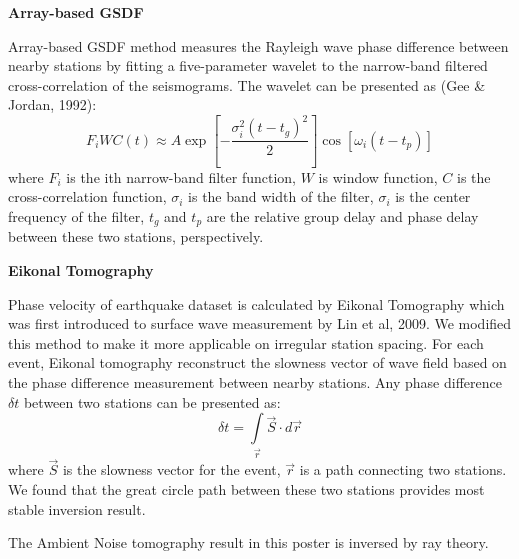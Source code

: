 \documentclass[paperwidth=65in,paperheight=43in,landscape,final,fontscale=0.30]{baposter}
\begin{document}
\begin{poster}
{\vspace{1em}

\noindent\textbf{\large Array-based GSDF}

Array-based GSDF method measures the Rayleigh wave phase difference between nearby stations by fitting a five-parameter wavelet to the narrow-band filtered cross-correlation of the seismograms. The wavelet can be presented as (Gee \& Jordan, 1992):
\begin{equation}
F_i W C(t) \approx A \exp \left[ - \frac{\sigma_i^2(t -t_g)^2}{2} \right] \cos \left[ \omega_i(t-t_p) \right]
\label{eqn:gsdf}
\end{equation}
where $F_i$ is the ith narrow-band filter function, $W$ is window function, $C$ is the cross-correlation function, $\sigma_i$ is the band width of the filter, $\sigma_i$ is the center frequency of the filter, $t_g$ and $t_p$ are the relative group delay and phase delay between these two stations, perspectively.

\vspace{1em}

\noindent\textbf{\large Eikonal Tomography}

Phase velocity of earthquake dataset is calculated by Eikonal Tomography which was first introduced to surface wave measurement by Lin et al, 2009. We modified this method to make it more applicable on irregular station spacing. For each event, Eikonal tomography reconstruct the slowness vector of wave field based on the phase difference measurement between nearby stations. Any phase difference $\delta t$ between two stations can be presented as:
\begin{equation}
	\delta t = \int\limits_{\vec{r}} \vec{S} \cdot d\vec{r}
\label{eqn:eikonal}
\end{equation}
where $\vec{S}$ is the slowness vector for the event, $\vec{r}$ is a path connecting two stations. We found that the great circle path between these two stations provides most stable inversion result.

The Ambient Noise tomography result in this poster is inversed by ray theory.

  }


\end{poster}
\end{document}
